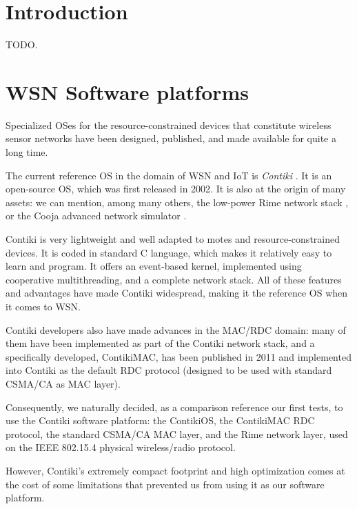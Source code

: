 \documentclass[conference]{IEEEtran}
\begin{document}
\IEEEpeerreviewmaketitle


\section{Introduction}

TODO.



\section{WSN Software platforms}

Specialized OSes for the resource-constrained devices that constitute
wireless sensor networks have been designed, published, and made available
for quite a long time.


The current reference OS in the domain of WSN and IoT is \emph{Contiki}
\cite{ContikiOS}. It is an open-source OS, which was first released
in 2002. It is also at the origin of many assets: we can mention, among
many others, the low-power Rime network stack \cite{Rime}, or the Cooja
advanced network simulator \cite{Cooja}.

Contiki is very lightweight and well adapted to motes and
resource-constrained devices. It is coded in standard C language, which
makes it relatively easy to learn and program. It offers an event-based
kernel, implemented using cooperative multithreading, and a complete
network stack. All of these features and advantages have made
Contiki widespread, making it the reference OS when it comes to WSN.

Contiki developers also have made advances in the MAC/RDC domain: many
of them have been implemented as part of the Contiki network stack, and
a specifically developed, ContikiMAC, has been published in 2011
\cite{ContikiMAC} and implemented into Contiki as the default
RDC protocol (designed to be used with standard CSMA/CA as MAC layer).

Consequently, we naturally decided, as a comparison reference our first tests,
to use the Contiki software platform: the ContikiOS, the ContikiMAC RDC
protocol, the standard CSMA/CA MAC layer, and the Rime network layer, used
on the IEEE 802.15.4 physical wireless/radio protocol.

\bigskip

However, Contiki's extremely compact footprint and high optimization comes
at the cost of some limitations that prevented us from using it as our
software platform.
\end{document}
